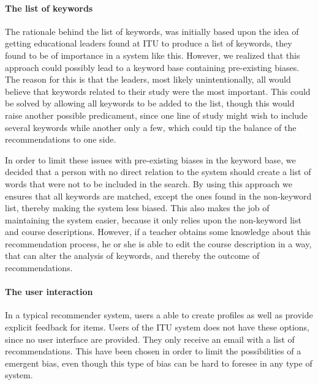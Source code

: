 \paragraph{The list of keywords}
The rationale behind the list of keywords, was initially based upon the idea of getting educational leaders found at ITU to produce a list of keywords, they found to be of importance in a system like this. However, we realized that this approach could possibly lead to a keyword base containing pre-existing biases. The reason for this is that the leaders, most likely unintentionally, all would believe that keywords related to their study were the most important.\newline
This could be solved by allowing all keywords to be added to the list, though this would raise another possible predicament, since one line of study might wish to include several keywords while another only a few, which could tip the balance of the recommendations to one side.

In order to limit these issues with pre-existing biases in the keyword base, we decided that a person with no direct relation to the system should create a list of words that were not to be included in the search. By using this approach we ensures that all keywords are matched, except the ones found in the non-keyword list, thereby making the system less biased.
This also makes the job of maintaining the system easier, because it only relies upon the non-keyword list and course descriptions.\newline
However, if a teacher obtains some knowledge about this recommendation process, he or she is able to edit the course description in a way, that can alter the analysis of keywords, and thereby the outcome of recommendations.

\paragraph{The user interaction}
In a typical recommender system, users a able to create profiles as well as provide explicit feedback for items. Users of the ITU system does not have these options, since no user interface are provided. They only receive an email with a list of recommendations. This have been chosen in order to limit the possibilities of a emergent bias, even though this type of bias can be hard to foresee in any type of system.


